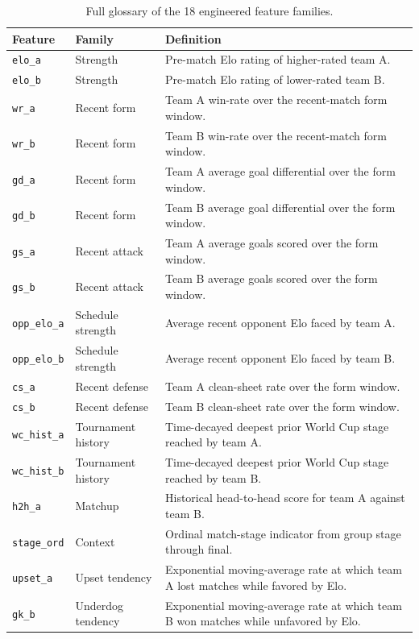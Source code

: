 \documentclass{article}
\begin{document}
\begin{table}[ht]
\centering
\scriptsize
\caption{Full glossary of the 18 engineered feature families.}
\label{tab:glossary}
\begin{tabularx}{\textwidth}{llX}
\toprule
Feature & Family & Definition \\
\midrule
\texttt{elo\_a} & Strength & Pre-match Elo rating of higher-rated team A. \\
\texttt{elo\_b} & Strength & Pre-match Elo rating of lower-rated team B. \\
\texttt{wr\_a} & Recent form & Team A win-rate over the recent-match form window. \\
\texttt{wr\_b} & Recent form & Team B win-rate over the recent-match form window. \\
\texttt{gd\_a} & Recent form & Team A average goal differential over the form window. \\
\texttt{gd\_b} & Recent form & Team B average goal differential over the form window. \\
\texttt{gs\_a} & Recent attack & Team A average goals scored over the form window. \\
\texttt{gs\_b} & Recent attack & Team B average goals scored over the form window. \\
\texttt{opp\_elo\_a} & Schedule strength & Average recent opponent Elo faced by team A. \\
\texttt{opp\_elo\_b} & Schedule strength & Average recent opponent Elo faced by team B. \\
\texttt{cs\_a} & Recent defense & Team A clean-sheet rate over the form window. \\
\texttt{cs\_b} & Recent defense & Team B clean-sheet rate over the form window. \\
\texttt{wc\_hist\_a} & Tournament history & Time-decayed deepest prior World Cup stage reached by team A. \\
\texttt{wc\_hist\_b} & Tournament history & Time-decayed deepest prior World Cup stage reached by team B. \\
\texttt{h2h\_a} & Matchup & Historical head-to-head score for team A against team B. \\
\texttt{stage\_ord} & Context & Ordinal match-stage indicator from group stage through final. \\
\texttt{upset\_a} & Upset tendency & Exponential moving-average rate at which team A lost matches while favored by Elo. \\
\texttt{gk\_b} & Underdog tendency & Exponential moving-average rate at which team B won matches while unfavored by Elo. \\
\bottomrule
\end{tabularx}
\end{table}
\end{document}
